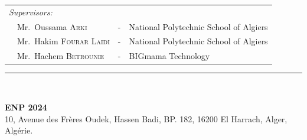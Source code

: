 {\begin{titlepage}
\begin{center}
\begin{tabular}{llcl}
            \\
            \textit{Supervisors:}                                  &   &                                        & \\
            \multicolumn{2}{l}{~~Mr.\ Oussama \textsc{Arki}}       & - & National Polytechnic School of Algiers   \\
            \multicolumn{2}{l}{~~Mr.\ Hakim \textsc{Fourar Laidi}} & - & National Polytechnic School of Algiers   \\
            \multicolumn{2}{l}{~~Mr.\ Hachem \textsc{Betrounie}}   & - & BIGmama Technology                       \\
        \end{tabular}
    \end{center}

    \vspace*{12mm}

    \rule{\linewidth}{1pt} \\[5mm]
    \begin{center}
        \textbf{ENP 2024} \\
        10, Avenue des Frères Oudek, Hassen Badi, BP. 182, 16200 El Harrach, Alger, Algérie.
    \end{center}

\end{titlepage}
}